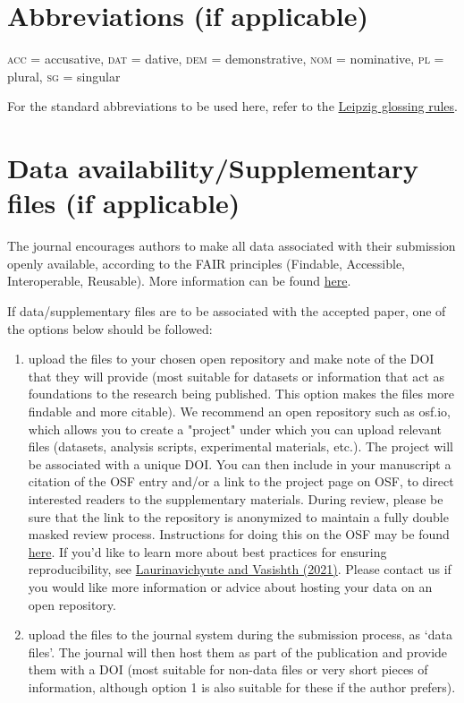 \documentclass[times,linguex,xcolor]{glossa}
\begin{document}
\pagebreak
\section*{Abbreviations (if applicable)}\label{abbrev}

\textsc{acc} = accusative, \textsc{dat} = dative, \textsc{dem} = demonstrative, \textsc{nom} = nominative, \textsc{pl} = plural, \textsc{sg} = singular

For the standard abbreviations to be used here, refer to the \href{https://www.eva.mpg.de/lingua/resources/glossing-rules.php}{Leipzig glossing rules}.

\section*{Data availability/Supplementary files (if applicable)}

The journal encourages authors to make all data associated with their submission openly available, according to the FAIR principles (Findable, Accessible, Interoperable, Reusable). More information can be found \href{https://www.glossa-journal.org/site/editorial-policies/#data-policy}{here}.

If data/supplementary files are to be associated with the accepted paper, one of the options below should be followed:
\begin{enumerate}
\item upload the files to your chosen open repository and make note of the DOI that they will provide (most suitable for datasets or information that act as foundations to the research being published. This option makes the files more findable and more citable). We recommend an open repository such as osf.io, which allows you to create a "project" under which you can upload relevant files (datasets, analysis scripts, experimental materials, etc.). The project will be associated with a unique DOI. You can then include in your manuscript a citation of the OSF entry and/or a link to the project page on OSF, to direct interested readers to the supplementary materials. During review, please be sure that the link to the repository is anonymized to maintain a fully double masked review process. Instructions for doing this on the OSF may be found \href{https://help.osf.io/hc/en-us/articles/360019930333-Create-a-View-only-Link-for-a-Project}{here}. If you'd like to learn more about best practices for ensuring reproducibility, see \href{https://psyarxiv.com/hf297/}{Laurinavichyute and Vasishth (2021)}. Please contact us if you would like more information or advice about hosting your data on an open repository.
\item upload the files to the journal system during the submission process, as `data files'. The journal will then host them as part of the publication and provide them with a DOI (most suitable for non-data files or very short pieces of information, although option 1 is also suitable for these if the author prefers).
\end{enumerate}
\end{document}
